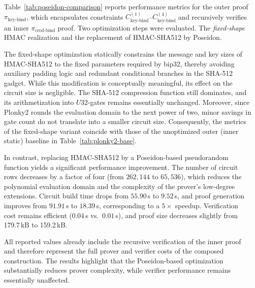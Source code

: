 Table~\ref{tab:poseidon-comparison} reports performance metrics for the outer proof $\pi_{\text{key-bind}}$, which encapsulates constraints $C_{\text{key-bind}}^{(1)}$–$C_{\text{key-bind}}^{(4)}$ and recursively verifies an inner $\pi_{\text{cred-bind}}$ proof. Two optimization steps were evaluated. The \emph{fixed-shape} HMAC realization and the replacement of HMAC-SHA512 by Poseidon. 

The fixed-shape optimization statically constrains the message and key sizes of HMAC-SHA512 to the fixed parameters required by \acrshort{bip32}, thereby avoiding auxiliary padding logic and redundant conditional branches in the SHA-512 gadget. While this modification is conceptually meaningful, its effect on the circuit size is negligible. The SHA-512 compression function still dominates, and its arithmetization into $U32$-gates remains essentially unchanged. Moreover, since Plonky2 rounds the evaluation domain to the next power of two, minor savings in gate count do not translate into a smaller circuit size. Consequently, the metrics of the fixed-shape variant coincide with those of the unoptimized outer (inner static) baseline in Table~\ref{tab:plonky2-base}.

In contrast, replacing HMAC-SHA512 by a Poseidon-based pseudorandom function yields a significant performance improvement. The number of circuit rows decreases by a factor of four (from $262{,}144$ to $65{,}536$), which reduces the polynomial evaluation domain and the complexity of the prover’s low-degree extensions. Circuit build time drops from $55.90$\,s to $9.52$\,s, and proof generation improves from $91.91$\,s to $18.39$\,s, corresponding to a $5\times$ speedup. Verification cost remains efficient ($0.04$\,s vs.\ $0.01$\,s), and proof size decreases slightly from 179.7\,kB to 159.2\,kB.

All reported values already include the recursive verification of the inner proof and therefore represent the full prover and verifier costs of the composed construction. The results highlight that the Poseidon-based optimization substantially reduces prover complexity, while verifier performance remains essentially unaffected.

